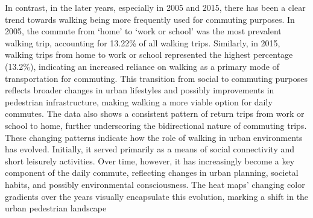 \documentclass[
11pt, %
oneside, %
english, %
singlespacing, %
]{macthesis} %
\begin{document}
In contrast, in the later years, especially in 2005 and 2015, there has been a clear trend towards walking being more frequently used for commuting purposes. In 2005, the commute from `home' to `work or school' was the most prevalent walking trip, accounting for 13.22\% of all walking trips. Similarly, in 2015, walking trips from home to work or school represented the highest percentage (13.2\%), indicating an increased reliance on walking as a primary mode of transportation for commuting. This transition from social to commuting purposes reflects broader changes in urban lifestyles and possibly improvements in pedestrian infrastructure, making walking a more viable option for daily commutes. The data also shows a consistent pattern of return trips from work or school to home, further underscoring the bidirectional nature of commuting trips.
These changing patterns indicate how the role of walking in urban environments has evolved. Initially, it served primarily as a means of social connectivity and short leisurely activities. Over time, however, it has increasingly become a key component of the daily commute, reflecting changes in urban planning, societal habits, and possibly environmental consciousness. The heat maps' changing color gradients over the years visually encapsulate this evolution, marking a shift in the urban pedestrian landscape
\end{document}
